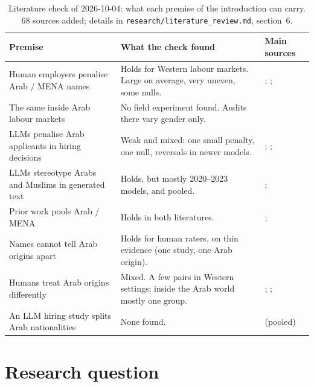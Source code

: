 \documentclass[11pt]{article}
\begin{document}
\begin{table}[t]
\small
\centering
\renewcommand{\arraystretch}{1.15}
\begin{tabular}{@{}p{4.2cm}p{6.2cm}p{4.6cm}@{}}
\toprule
\textbf{Premise} & \textbf{What the check found} & \textbf{Main sources} \\
\midrule
Human employers penalise Arab / MENA names & Holds for Western labour markets. Large on average, very uneven, some nulls. & \citealp{lippens2023state}; \citealp{quillian2023trends}; \citealp{arnoult2021discrimination} \\
The same inside Arab labour markets & No field experiment found. Audits there vary gender only. & \citealp{krafft2025employers} \\
LLMs penalise Arab applicants in hiring decisions & Weak and mixed: one small penalty, one null, reversals in newer models. & \citealp{lippens2024computer}; \citealp{hoffmann2026evaluating}; \citealp{bunel2026customer} \\
LLMs stereotype Arabs and Muslims in generated text & Holds, but mostly 2020--2023 models, and pooled. & \citealp{abid2021persistent}; \citealp{shieh2026intersectional} \\
Prior work pools Arab / MENA & Holds in both literatures. & \citealp{lippens2023state}; \citealp{lippens2024computer} \\
Names cannot tell Arab origins apart & Holds for human raters, on thin evidence (one study, one Arab origin). & \citealp{martiniello2022signaling} \\
Humans treat Arab origins differently & Mixed. A few pairs in Western settings; inside the Arab world mostly one group. & \citealp{vernby2019immigrants}; \citealp{shockley2024sharing}; \citealp{blaydes2023arab} \\
An LLM hiring study splits Arab nationalities & None found. & \citealp{albaroudi2026addressing} (pooled) \\
\bottomrule
\end{tabular}
\caption{Literature check of 2026-10-04: what each premise of the introduction can carry. 68 sources added; details in \texttt{research/literature\_review.md}, section~6.}
\label{tab:check}
\end{table}

\section{Research question}
\end{document}
